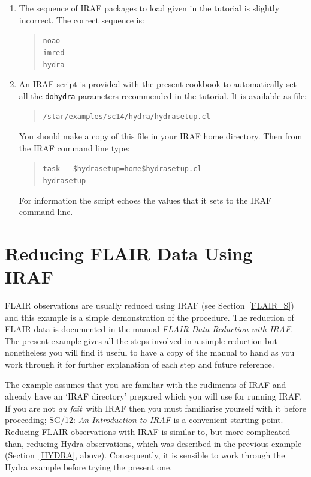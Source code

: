 \documentclass[twoside,11pt]{article}
\newcommand{\xref}[3]{#1}
\newcommand{\xlabel}[1]{}
\begin{document}
\begin{enumerate}

  \item The sequence of IRAF packages to load given in the tutorial
   is slightly incorrect.  The correct sequence is:

  \begin{quote}
   {\tt noao \\
   imred     \\
   hydra}
  \end{quote}

  \item An IRAF script is provided with the present cookbook to
   automatically set all the {\tt dohydra} parameters recommended in
   the tutorial.  It is available as file:

  \begin{quote}
   {\tt /star/examples/sc14/hydra/hydrasetup.cl}
  \end{quote}

   You should make a copy of this file in your IRAF home directory.
   Then from the IRAF command line type:

  \begin{quote}
   {\tt task ~ \$hydrasetup=home\$hydrasetup.cl \\
   hydrasetup}
  \end{quote}

   For information the script echoes the values that it sets to the
   IRAF command line.

\end{enumerate}


\newpage
\section{\xlabel{FLAIR}\label{FLAIR}Reducing FLAIR Data Using IRAF}

FLAIR observations are usually reduced using IRAF (see
Section~\ref{FLAIR_S}) and this example is a simple demonstration
of the procedure.  The reduction of FLAIR data is documented
in the manual {\it FLAIR Data Reduction with
IRAF}\/\cite{DRINK96}.  The present example gives all the steps
involved in a simple reduction but nonetheless you will find it
useful to have a copy of the manual to hand as you work through
it for further explanation of each step and future reference.

The example assumes that you are familiar with the rudiments
of IRAF and already have an `IRAF directory' prepared which
you will use for running IRAF.  If you are not {\it au fait}\, with
IRAF then you must familiarise yourself with it before proceeding;
\xref{SG/12: {\it An Introduction to IRAF}}{sg12}{}\/\cite{SG12}
is a convenient starting point.  Reducing FLAIR observations with
IRAF is similar to, but more complicated than, reducing Hydra
observations, which was described in the previous example
(Section~\ref{HYDRA}, above).  Consequently, it is sensible to work
through the Hydra example before trying the present one.
\end{document}
